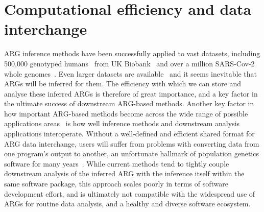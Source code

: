 \documentclass{article}
\begin{document}
\section{Computational efficiency and data interchange}
\label{sec-efficiency}
ARG inference methods have been successfully applied to vast datasets,
including 500,000 genotyped humans~\citep{kelleher2019inferring,zhang2023biobank}
from UK Biobank~\citep{bycroft2018genome}
and over a million SARS-Cov-2 whole genomes~\citep{zhan2023towards}.
Even larger datasets are
available~\citep[e.g.][]{halldorsson2022sequences} %
and it seems inevitable that ARGs will be inferred for them.
The efficiency with which we can store and analyse these inferred
ARGs is therefore of great importance, and a key factor
in the ultimate success of downstream ARG-based methods.
Another key factor in how important ARG-based methods become
across the wide range of possible applications
areas~\citep{rasmussen2014genome,harris2019database,
hejase2020summary,schaefer2021ancestral,
fan2022genealogical,wohns2022unified,harris2023using,
nowbandegani2023extremely,ignatieva2023distribution}
is how well inference methods and downstream analysis applications
interoperate. Without a well-defined and efficient shared format
for ARG data interchange,
users will suffer from problems with converting data from one program's
output to another, an unfortunate hallmark of population genetics
software for many years~\citep{excoffier2006computer}.
While current methods tend to tightly couple downstream analysis
of the inferred ARG with the inference
itself within the same software package,
this approach scales poorly in terms of software development
effort, and is ultimately not compatible with the widespread use
of ARGs for routine data analysis, and a healthy and diverse
software ecosystem.
\end{document}
